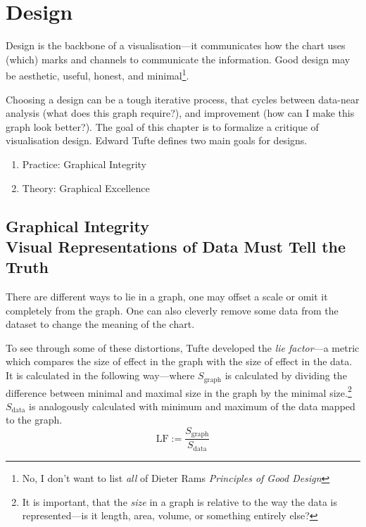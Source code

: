 \chapter{Design}
Design is the backbone of a visualisation---it communicates how the chart uses (which) marks and channels to communicate the information.
Good design may be aesthetic, useful, honest, and minimal\footnote{No, I don't want to list \emph{all} of Dieter Rams \emph{Principles of Good Design}}.

Choosing a design can be a tough iterative process, that cycles between data-near analysis (what does this graph require?), and improvement (how can I make this graph look better?).
The goal of this chapter is to formalize a critique of visualisation design.
Edward Tufte defines two main goals for designs.

\begin{enumerate}
    \item Practice: Graphical Integrity
    \item Theory: Graphical Excellence
\end{enumerate}

\section[Graphical Integrity]{Graphical Integrity \\ {\large Visual Representations of Data Must Tell the Truth}}
There are different ways to lie in a graph, one may offset a scale or omit it completely from the graph.
One can also cleverly remove some data from the dataset to change the meaning of the chart.

To see through some of these distortions, Tufte developed the \emph{lie factor}---a metric which compares the size of effect in the graph with the size of effect in the data.
It is calculated in the following way---where \(S_\text{graph}\) is calculated by dividing the difference between minimal and maximal size in the graph by the minimal size.\footnote{It is important, that the \emph{size} in a graph is relative to the way the data is represented---is it length, area, volume, or something entirely else?}
\(S_\text{data}\) is analogously calculated with minimum and maximum of the data mapped to the graph.
\[\text{LF} := \frac{S_\text{graph}}{S_\text{data}}\]

